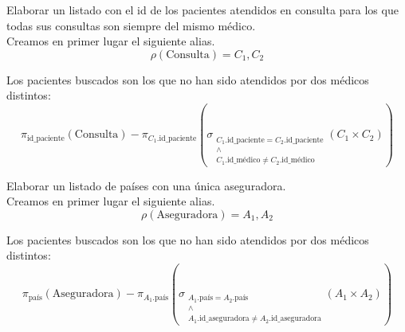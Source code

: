 \documentclass[12pt]{article}
\begin{document}
\begin{ejercicio}[AR]
    Elaborar un listado con el id de los pacientes atendidos en consulta para los que todas sus consultas son siempre del mismo médico.\\

    Creamos en primer lugar el siguiente alias.
    \begin{equation*}
        \rho(\text{Consulta})=C_1,C_2
    \end{equation*}

    Los pacientes buscados son los que no han sido atendidos por dos médicos distintos:
    \begin{equation*}
        \pi_{\text{id\_paciente}}(\text{Consulta})
        - \pi_{C_1.\text{id\_paciente}}\left(\sigma_{\substack{C_1.\text{id\_paciente}=C_2.\text{id\_paciente}\\\land \\ C_1.\text{id\_médico}\neq C_2.\text{id\_médico}}}(C_1\times C_2)\right)
    \end{equation*}
\end{ejercicio}

\begin{ejercicio}[AR]
    Elaborar un listado de países con una única aseguradora.\\
    Creamos en primer lugar el siguiente alias.
    \begin{equation*}
        \rho(\text{Aseguradora})=A_1,A_2
    \end{equation*}

    Los pacientes buscados son los que no han sido atendidos por dos médicos distintos:
    \begin{equation*}
        \pi_{\text{país}}(\text{Aseguradora})
        - \pi_{A_1.\text{país}}\left(\sigma_{\substack{A_1.\text{país}=A_2.\text{país}\\\land \\ A_1.\text{id\_aseguradora}\neq A_2.\text{id\_aseguradora}}}(A_1\times A_2)\right)
    \end{equation*}
\end{ejercicio}
\end{document}
